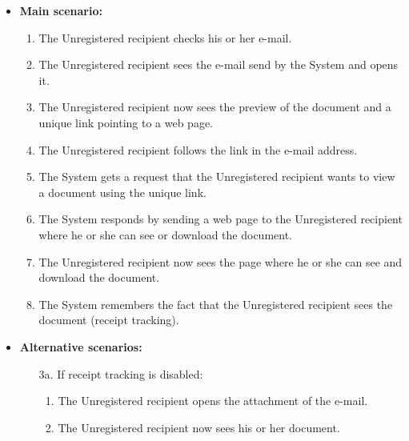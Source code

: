 \documentclass[a4paper,10pt]{article}
\begin{document}
\begin{itemize}
    \item \textbf{Main scenario:} 
    \begin{enumerate}
       \item The Unregistered recipient checks his or her e-mail.
       \item The Unregistered recipient sees the e-mail send by the System and opens it. 
       \item The Unregistered recipient now sees the preview of the document and a unique link pointing to a web page.
       \item The Unregistered recipient follows the link in the e-mail address.
       \item The System gets a request that the Unregistered recipient wants to view a document using the unique link.
       \item The System responds by sending a web page to the Unregistered recipient where he or she can see or download the document.
       \item The Unregistered recipient now sees the page where he or she can see and download the document.   
       \item The System remembers the fact that the Unregistered recipient sees the document (receipt tracking).
     \end{enumerate}

    \item \textbf{Alternative scenarios:} 
    \begin{enumerate}
        \item [3a.] If receipt tracking is disabled:
        \begin{enumerate}
              \item The Unregistered recipient opens the attachment of the e-mail. 
              \item The Unregistered recipient now sees his or her document. 
        \end{enumerate}
    \end{enumerate}
\end{itemize}
\end{document}
